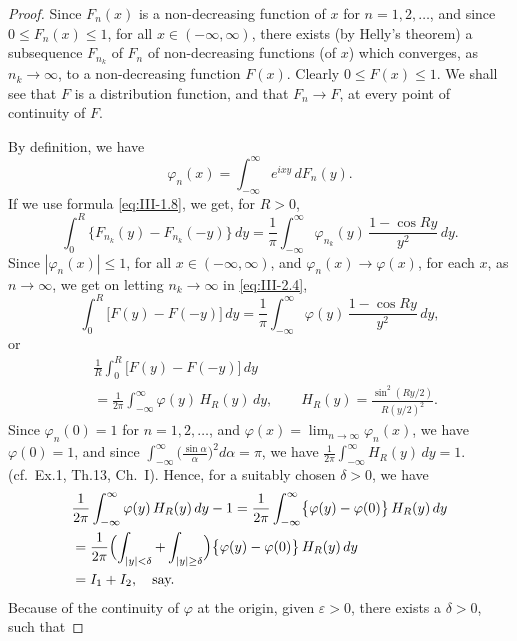 \begin{proof}
Since $F_{n}(x)$ is a non-decreasing function of $x$ for $n=1,2,\dots$, and since $0\le F_{n}(x)\le1$, for all $x\in(-\infty,\infty)$, there exists (by Helly's theorem) a subsequence $F_{n_{k}}$ of $F_{n}$ of non-decreasing functions (of $x$) which converges, as $n_{k}\to\infty$, to a non-decreasing function $F(x)$. Clearly $0\le F(x)\le1$. We shall see that $F$ is a distribution function, and that $F_{n}\to F$, at every point of continuity of $F$.

By definition, we have
\[
\varphi_{n}(x)=\int_{-\infty}^{\infty}e^{ixy}\,dF_{n}(y).
\]
If we use formula \eqref{eq:III-1.8}, we get, for $R>0$,
\begin{equation}\tag{2.4}\label{eq:III-2.4}
\int_{0}^{R}\bigl\{F_{n_{k}}(y)-F_{n_{k}}(-y)\bigr\}\,dy
=\frac{1}{\pi}\int_{-\infty}^{\infty}\varphi_{n_{k}}(y)\,\frac{1-\cos Ry}{y^{2}}\,dy.
\end{equation}
Since $|\varphi_{n}(x)|\le1$, for all $x\in(-\infty,\infty)$, and $\varphi_{n}(x)\to\varphi(x)$, for each $x$, as $n\to\infty$, we get on letting $n_{k}\to\infty$ in \eqref{eq:III-2.4},
\[
\int_{0}^{R}\bigl[F(y)-F(-y)\bigr]\,dy=\frac{1}{\pi}\int_{-\infty}^{\infty}\varphi(y)\,\frac{1-\cos Ry}{y^{2}}\,dy,
\]
or
\begin{equation}\tag{2.5}\label{eq:III-2.5}
\begin{aligned}
&\frac{1}{R}  \int_{0}^{R}  \bigl[F(y)-F(-y)\bigr]\,dy\\
&= \frac{1}{2\pi}  \int_{-\infty}^{\infty}\varphi(y)\,H_{R}(y)\,dy,  \qquad H_{R}(y) = \frac{\sin^{2}(Ry/2)}{R(y/2)^{2}}.
\end{aligned}
\end{equation}
Since $\varphi_{n}(0)=1$ for $n=1,2,\dots$, and $\varphi(x)=\lim_{n\to\infty}\varphi_{n}(x)$, we have $\varphi(0)=1$, and since $\int_{-\infty}^{\infty}\bigl(\frac{\sin\alpha}{\alpha}\bigr)^{2}d\alpha=\pi$, we have $\frac{1}{2\pi}\int_{-\infty}^{\infty}H_{R}(y)\,dy=1$. (cf.\ Ex.1, Th.13, Ch.~I). Hence, for a suitably chosen $\delta>0$, we have
\begin{align*}
&\frac{1}{2\pi}\int_{-\infty}^{\infty}\varphi(y)\,H_{R}(y)\,dy-1
=\frac{1}{2\pi}\int_{-\infty}^{\infty}\bigl\{\varphi(y)-\varphi(0)\bigr\}\,H_{R}(y)\,dy\\
&=\frac{1}{2\pi}\Bigl(\int_{|y|<\delta}+\int_{|y|\ge\delta}\Bigr)\bigl\{\varphi(y)-\varphi(0)\bigr\}\,H_{R}(y)\,dy\\
&=I_{1}+I_{2},\quad\text{say.}
\end{align*}
Because of the continuity of $\varphi$ at the origin, given $\varepsilon>0$, there exists a $\delta>0$, such that

\end{proof}
